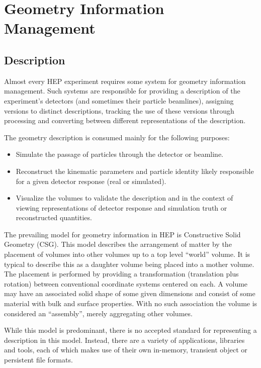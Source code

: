 \section{Geometry Information Management}


\subsection{Description}

Almost every HEP experiment requires some system for geometry
information management.  Such systems are responsible for providing a
description of the experiment's detectors (and sometimes their
particle beamlines), assigning versions to distinct descriptions,
tracking the use of these versions through processing and converting
between different representations of the description.  

The geometry description is consumed mainly for the following
purposes:

\begin{itemize}
\item Simulate the passage of particles through the detector or
  beamline.  
\item Reconstruct the kinematic parameters and particle identity
  likely responsible for a given detector response (real or
  simulated).
\item Visualize the volumes to validate the description and in the
  context of viewing representations of detector response and
  simulation truth or reconstructed quantities.
\end{itemize}

The prevailing model for geometry information in HEP is Constructive
Solid Geometry (CSG).  This model describes the arrangement of matter
by the placement of volumes into other volumes up to a top level
``world'' volume.  It is typical to describe this as a daughter volume
being placed into a mother volume.  The placement is performed by
providing a transformation (translation plus rotation) between
conventional coordinate systems centered on each.  A volume may have
an associated solid shape of some given dimensions and consist of some
material with bulk and surface properties.  With no such association
the volume is considered an ``assembly'', merely aggregating other
volumes.

While this model is predominant, there is no accepted standard for
representing a description in this model.  Instead, there are a
variety of applications, libraries and tools, each of which makes use
of their own in-memory, transient object or persistent file formats.  

